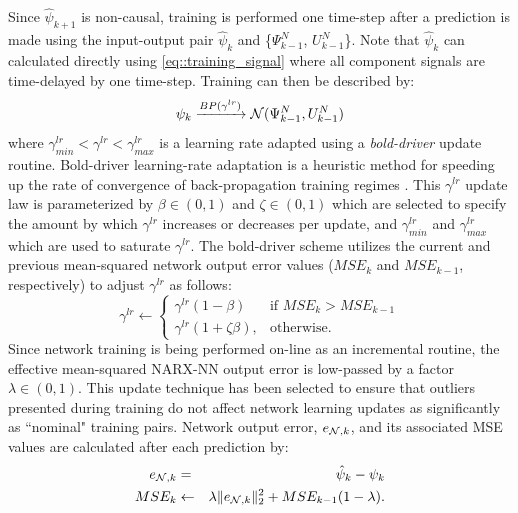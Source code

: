 			Since $\hat{\psi}_{k+1}$ is non-causal, training is performed one time-step after a prediction is made using the input-output pair $\hat{\psi}_{k}$ and \{${\Psi}_{k-1}^{N}$, ${U}_{k-1}^{N}$\}. Note that $\hat{\psi}_{k}$ can calculated directly using \ref{eq::training_signal} where all component signals are time-delayed by one time-step. Training can then be described by:
				\begin{equation}
					\psi_{k} \xrightarrow{BP(\gamma^{lr})} {\cal N}({\Psi}_{k-1}^{N},{U}_{k-1}^{N})
					\label{eq::training}
				\end{equation}
			where $\gamma^{lr} _{min} < \gamma^{lr} < \gamma^{lr} _{max}$ is a learning rate adapted using a \emph{bold-driver} update routine. Bold-driver learning-rate adaptation is a  heuristic method for speeding up the rate of convergence of back-propagation training regimes \cite{Battiti1992,Magoulas1999}. This $\gamma^{lr}$ update law is parameterized by $\beta \in (0,1)$ and $\zeta \in (0,1)$ which are selected to specify the amount by which $\gamma^{lr}$ increases or decreases per update, and $\gamma^{lr} _{min}$ and $\gamma^{lr} _{max}$ which are used to saturate $\gamma^{lr}$.  The bold-driver scheme utilizes the current and previous mean-squared network output error values ($MSE_{k}$ and $MSE_{k-1}$, respectively) to adjust $\gamma^{lr}$ as follows:
				\begin{equation}
				    \gamma^{lr} \leftarrow 
					\begin{cases}
				    \gamma^{lr} (1- \beta) 		& \text{if } MSE_{k} > MSE_{k-1}\\
				    \gamma^{lr} (1+\zeta \beta),& \text{otherwise}.
					\end{cases}
				\end{equation}
			Since network training is being performed on-line as an incremental routine, the effective mean-squared NARX-NN  output error is low-passed by a factor $\lambda \in (0,1)$. This update technique has been selected to ensure that outliers presented during training do not affect network learning updates as significantly as ``nominal" training pairs. Network output error, $e_{{\cal N},k}$, and its associated MSE values are calculated after each prediction by:
				\begin{eqnarray}
					e_{{\cal N},k} 	&=& \hat{\psi}_{k} - \psi_{k} \nonumber\\
					MSE_{k} 		&\leftarrow& \lambda \|e_{{\cal N},k}\|_{2}^{2} + MSE_{k-1}(1-\lambda).
				\end{eqnarray}


